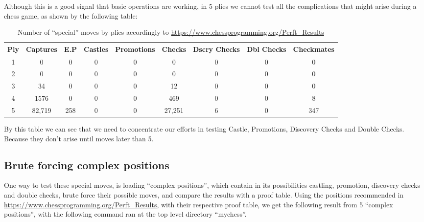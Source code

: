 \documentclass[10pt]{article}
\begin{document}
Although this is a good signal that basic operations are working, in 5 plies we
cannot test all the complications that might arise during a chess game, as shown
by the following table:

\begin{table}[H]
\center
\begin{tabular}{|c|c|c|c|c|c|c|c|c|}
\hline
\textbf{Ply}   & \textbf{Captures} & \textbf{E.P} &
\textbf{Castles} & \textbf{Promotions} & \textbf{Checks} & \textbf{Dscry
Checks} & \textbf{Dbl Checks} & \textbf{Checkmates} \\
\hline
   1  & 0 & 0 & 0 & 0 & 0 & 0 & 0 & 0 \\
\hline
   2  & 0 & 0 & 0 & 0 & 0 & 0 & 0 & 0 \\
\hline
   3  & 34 & 0 & 0 & 0 & 12 & 0 & 0 & 0 \\
\hline
   4  & 1576 & 0 & 0 & 0 & 469 & 0 & 0 & 8 \\
\hline
5  & 82,719 & 258 & 0 & 0 & 27,251 & 6 & 0 & 347 \\
\hline
\end{tabular}
\caption{Number of ``special'' moves by plies accordingly to
\url{https://www.chessprogramming.org/Perft_Results} }
\end{table}

By this table we can see that we need to concentrate our efforts in testing
Castle, Promotions, Discovery Checks and Double Checks. Because they don't arise
until moves later than 5.

\subsection{Brute forcing complex positions}


One way to test these special moves, is loading ``complex positions'', which contain in its
possibilities  castling, promotion, discovery checks and double checks, brute
force their
possible moves, and compare the results with a proof table. Using the
positions recommended in \url{https://www.chessprogramming.org/Perft_Results},
with their respective proof table,
we get the following result from 5 ``complex positions'', with the following
command ran at the top level directory ``mychess''.
\end{document}
